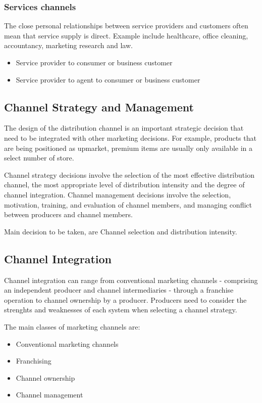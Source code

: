 \documentclass{article}
\begin{document}
\subsubsection*{Services channels}
The close personal relationships between service providers and customers often mean that service supply is direct. Example include healthcare, office cleaning, accountancy, marketing research and law.

\begin{itemize}
    \item Service provider to consumer or business customer
    \item Service provider to agent to consumer or business customer
\end{itemize}

\subsection{Channel Strategy and Management}
The design of the distribution channel is an important strategic decision that need to be integrated with other marketing decisions. For example, products that are being positioned as upmarket, premium items are usually only available in a select number of store. 

Channel strategy decisions involve the selection of the most effective distribution channel, the most appropriate level of distribution intensity and the degree of channel integration. Channel management decisions involve the selection, motivation, training, and evaluation of channel members, and managing conflict between producers and channel members.

Main decision to be taken, are Channel selection and distribution intensity.

\subsection{Channel Integration}
Channel integration can range from conventional marketing channels - comprising an independent producer and channel intermediaries - through a franchise operation to channel ownership by a producer. Producers need to consider the strenghts and weaknesses of each system when selecting a channel strategy. 

The main classes of marketing channels are:
\begin{itemize}
    \item Conventional marketing channels
    \item Franchising
    \item Channel ownership
    \item Channel management 
\end{itemize}
\end{document}
